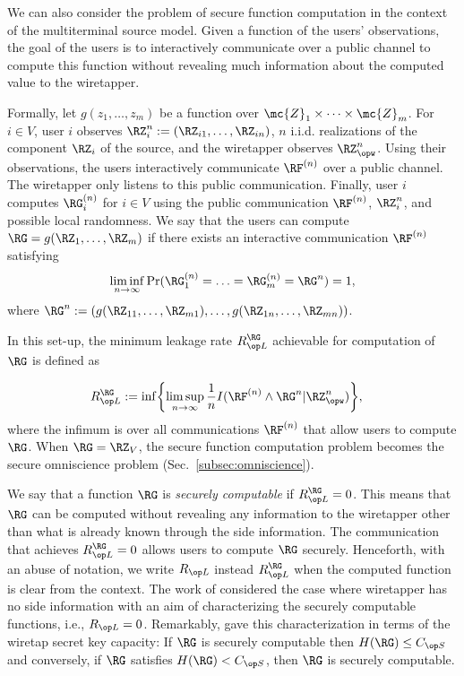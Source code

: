 {We can also consider the problem of secure function computation in the context of the multiterminal source model. Given a function of the users' observations, the goal of the users is to interactively communicate over a public channel to compute this function without revealing much information about the computed value to the wiretapper. 

Formally, let $g(z_1,\ldots,z_m)$ be a function over $\mc{Z}_1\times \cdots \times \mc{Z}_m$. For $i \in V$, user $i$ observes $\RZ_i^n:=(\RZ_{i1},\ldots,\RZ_{in})$, $n$ i.i.d. realizations of the component $\RZ_i$ of the source, and the wiretapper observes $\RZ_{\opw}^n$. Using their observations, the users interactively communicate $\RF^{(n)}$ over a public channel. The wiretapper only listens to this public communication.  Finally, user $i$ computes $\RG_i^{(n)}$ for $i \in V$ using the public communication $\RF^{(n)}$, $\RZ_i^n$, and possible local randomness. We say that the users can compute $\RG= g(\RZ_1,\ldots,\RZ_m)$ if there exists an interactive communication $\RF^{(n)}$ satisfying
    \begin{align}
\liminf_{n \to \infty} \Pr(\RG_1^{(n)} = \ldots =\RG_m^{(n)} = \RG^n) = 1 \label{eq:func:recoverability},
\end{align}
where $\RG^n:=(g(\RZ_{11},\ldots,\RZ_{m1}),\ldots, g(\RZ_{1n},\ldots,\RZ_{mn}))$.%

In this set-up, the minimum leakage rate $\rl^{\RG}$ achievable for computation of $\RG$ is defined as

\begin{align}
\begin{split}
 \rl^{\RG}&:= \inf  \biggl\lbrace \limsup_{n \to \infty} \frac{1}{n}I(\RF^{(n)} \wedge \RG^n|\RZ_{\opw}^n) \biggr\rbrace, \label{eq:rl:func}
 \end{split}
\end{align}
where the infimum is over all communications $\RF^{(n)}$ that allow users to compute $\RG$. When $\RG=\RZ_V$, the secure function computation problem becomes the secure omniscience problem (Sec.~\ref{subsec:omniscience}).

We say that a function $\RG$ is \emph{securely computable} if $\rl^{\RG}=0$. This means that $\RG$ can be computed without revealing any information to the wiretapper other than what is already known through the side information. The communication that achieves $\rl^{\RG}=0$ allows users to compute $\RG$ securely. Henceforth, with an abuse of notation, we write $\rl$ instead $\rl^{\RG}$ when the computed function is clear from the context. The work of \cite{tyagi11} considered the case where wiretapper has no side information with an aim of characterizing the securely computable functions, i.e., $\rl=0$. Remarkably, \cite{tyagi11} gave this characterization in terms of the wiretap secret key capacity: If $\RG$ is securely computable then $H(\RG)\leq \skc$ and conversely, if $\RG$ satisfies $H(\RG)< \skc$, then $\RG$ is securely computable. 



}
